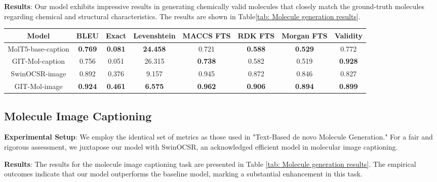 \documentclass{article}
\begin{document}
\textbf{Results}: Our model exhibits impressive results in generating chemically valid molecules that closely match the ground-truth molecules regarding chemical and structural characteristics. The results are shown in Table\ref{tab: Molecule generation results}.
 \begin{table*}[htbp]
	\centering
    \caption{\textbf{Molecule generation results}. Our model performs similarly to MolT5-base regarding metrics for generating SMILES molecules but excels in ensuring molecule validity. With a molecule validity of \textbf{92.8\%}, our model surpasses MolT5-base's validity of 77.2\% by over \textbf{20\%}. It also outperforms MolT5-large's molecule validity of \textbf{90.5\%}.}
    \label{tab: Molecule generation results}
	\begin{tabular}{c|c|c|c|c|c|c|c}
	\hline
	\textbf{Model} & \textbf{BLEU} & \textbf{Exact} & \textbf{Levenshtein} & \textbf{MACCS FTS} & \textbf{RDK FTS} & \textbf{Morgan FTS} & \textbf{Validity}\\
		\hline
		MolT5-base-caption & \textbf{0.769} & \textbf{0.081} & \textbf{24.458} & 0.721 & \textbf{0.588} & \textbf{0.529} & 0.772\\	\hline
		GIT-Mol-caption & 0.756  & 0.051 & 26.315 & \textbf{0.738} & 0.582 & 0.519 & \textbf{0.928}\\
		\hline
		SwinOCSR-image & 0.892 & 0.376 & 9.157 & 0.945 & 0.872 & 0.846 & 0.827\\	\hline
		GIT-Mol-image & \textbf{0.924} & \textbf{0.461} & \textbf{6.575} & \textbf{0.962} & \textbf{0.906} & \textbf{0.894} & \textbf{0.899}\\
		\hline
	\end{tabular}
\end{table*}

\subsection{Molecule Image Captioning}
\textbf{Experimental Setup}: We employ the identical set of metrics as those used in "Text-Based de novo Molecule Generation." For a fair and rigorous assessment, we juxtapose our model with SwinOCSR, an acknowledged efficient model in molecular image captioning.
 
\textbf{Results}: The results for the molecule image captioning task are presented in Table \ref{tab: Molecule generation results}. The empirical outcomes indicate that our model outperforms the baseline model, marking a substantial enhancement in this task.
\end{document}
